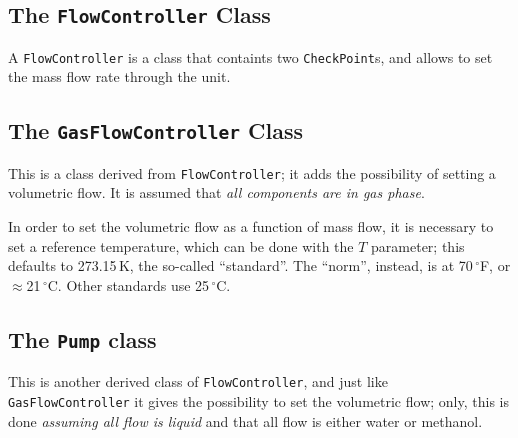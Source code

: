\documentclass[a4paper]{article}
\newcommand{\textdegree}{\ensuremath{^{\circ}}}
\begin{document}
\subsection{The \texttt{FlowController} Class}
A \texttt{FlowController} is a class that containts two \texttt{CheckPoint}s,
and allows to set the mass flow rate through the unit.


\subsection{The \texttt{GasFlowController} Class}
This is a class derived from \texttt{FlowController}; it adds the possibility
of setting a volumetric flow. It is assumed that \emph{all components are in
gas phase}.

In order to set the volumetric flow as a function of mass flow, it is necessary
to set a reference temperature, which can be done with the $T$ parameter; this
defaults to 273.15\,K, the so-called ``standard''. The ``norm'', instead, is at
70\,\textdegree F, or $\approx$21\,\textdegree C. Other standards use
25\,\textdegree C.


\subsection{The \texttt{Pump} class}
This is another derived class of \texttt{FlowController}, and just like
\texttt{GasFlowController} it gives the possibility to set the volumetric flow;
only, this is done \emph{assuming all flow is liquid} and that all flow is
either water or methanol.
\end{document}
